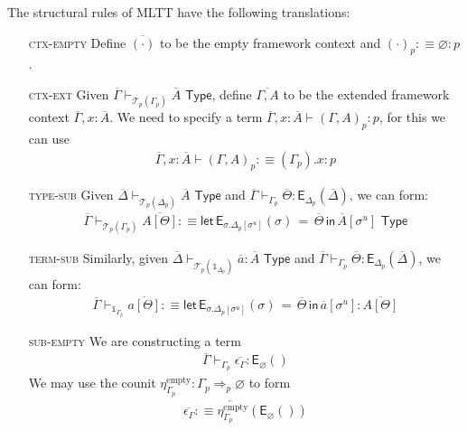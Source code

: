 \documentclass[10pt]{article}
\theoremstyle{definition}
\let\emptyset\varnothing
\newcommand{\yields}{\vdash}
\newcommand{\tcell}{\Rightarrow}
\newcommand{\TYPE}{\,\,\mathsf{Type}}
\newcommand{\rewrite}[2]{\overleftarrow{#1}(#2)}
\newcommand\E[2]{\ensuremath{\mathsf{E}_{#1}(#2)}}
\newcommand\EEs[4]{\ensuremath{\mathsf{let} \, \mathsf{E}_{#1}(#3) \, = \, {#2} \, \mathsf{in} \, #4}}
\newcommand\EIs[2]{\ensuremath{\mathsf{E}_{#1}{(#2)}}}
\newcommand\El[2]{\mathcal{T}_{#1}(#2)}
\newcommand\unp[2]{\ensuremath{{#2}^u}}
\newcommand{\modeof}[1]{{#1}_p}
\newcommand{\sempty}{\ensuremath{\mathrm{empty}}}
\newcommand{\upstairs}[1]{\overline{#1}}
\newcommand\One{\ensuremath{\mathds{1}}}
\begin{document}
The structural rules of MLTT have the following translations:
\begin{enumerate}
\item[\textsc{ctx-empty}] Define $\upstairs{(\cdot)}$ to be the empty framework context and $\modeof{(\cdot)} :\equiv \emptyset : p$.

\item[\textsc{ctx-ext}] Given $\upstairs{\Gamma}
  \yields_{\El{p}{\modeof{\Gamma}}} \upstairs{A} \TYPE$, define $\upstairs{\Gamma, A}$ to be the extended framework context $\upstairs{\Gamma}, x : \upstairs{A}$. We need to specify a term $\upstairs{\Gamma}, x : \upstairs{A} \yields \modeof{(\Gamma, A)} : p$, for this we can use
  \begin{align*}
  \upstairs{\Gamma}, x : \upstairs{A} \yields \modeof{(\Gamma, A)} :\equiv (\modeof{\Gamma}).x : p
  \end{align*}
  
\item[\textsc{type-sub}] Given $\upstairs{\Delta} \yields_{\El{p}{\modeof{\Delta}}} \upstairs{A} \TYPE$ and $\upstairs{\Gamma} \yields_{\modeof{\Gamma}} \upstairs{\Theta} : \E{\modeof{\Delta}}{\upstairs{\Delta}}$, we can form:
\begin{align*}
\upstairs{\Gamma} \yields_{\El{p}{\modeof{\Gamma}}} \upstairs{A[\Theta]} :\equiv \EEs{\sigma.\modeof{\Delta}[\unp{\Delta}{\sigma}]}{\upstairs{\Theta}}{\sigma}{\upstairs{A}[\unp{\Delta}{\sigma}]} \TYPE
\end{align*}

\item[\textsc{term-sub}] Similarly, given $\upstairs{\Delta} \yields_{\El{p}{\One_{\modeof{\Delta}}}} \upstairs{a} : \upstairs{A} \TYPE$ and $\upstairs{\Gamma} \yields_{\modeof{\Gamma}} \upstairs{\Theta} : \E{\modeof{\Delta}}{\upstairs{\Delta}}$, we can form:
\begin{align*}
\upstairs{\Gamma} \yields_{\One_{\modeof{\Gamma}}} \upstairs{a[\Theta]} :\equiv \EEs{\sigma.\modeof{\Delta}[\unp{\Delta}{\sigma}]}{\upstairs{\Theta}}{\sigma}{\upstairs{a}[\unp{\Delta}{\sigma}]} : \upstairs{A[\Theta]}
\end{align*}

\item[\textsc{sub-empty}] We are constructing a term
\begin{align*}
\upstairs{\Gamma} \yields_{\modeof{\Gamma}} \upstairs{\epsilon_\Gamma} : \E{\emptyset}{}
\end{align*}
We may use the counit $\eta^\sempty_{\modeof{\Gamma}} : \modeof{\Gamma} \tcell_p \emptyset$ to form
\begin{align*}
\upstairs{\epsilon_\Gamma} :\equiv \rewrite{\eta^\sempty_{\modeof{\Gamma}}}{\EIs{\emptyset}{}}
\end{align*}


\end{enumerate}
\end{document}
